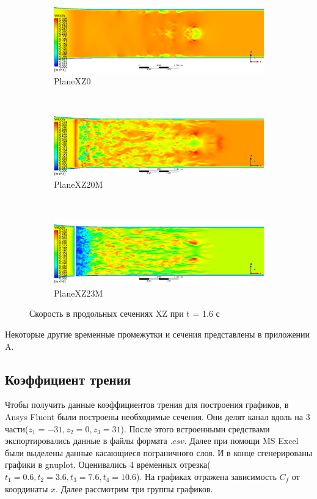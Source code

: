 	\begin{figure}[H]
		\begin{subfigure}{1\textwidth}
			\centering
			\includegraphics[width=1\linewidth]{../Assets/T16_Velocity_ContourXZ0}
			\caption{PlaneXZ0}
			\label{fig:T16VelocityContourXZ0}
		\end{subfigure}%
		\\
		\begin{subfigure}{1\textwidth}
			\centering
			\includegraphics[width=1\linewidth]{../Assets/T16_Velocity_ContourXZ20M}
			\caption{PlaneXZ20M}
			\label{fig:T16VelocityContourXZ20M}
		\end{subfigure}%
		\\
		\begin{subfigure}{1\textwidth}
			\centering
			\includegraphics[width=1\linewidth]{../Assets/T16_Velocity_ContourXZ23M}
			\caption{PlaneXZ23M}
			\label{fig:T16VelocityContourXZ23M}
		\end{subfigure}
	 	\caption{Скорость в продольных сечениях XZ при t = 1.6 с}
	 	\label{fig:T16VelocityContourXZ}
	\end{figure}
	Некоторые другие временные промежутки и сечения представлены в приложении A.
	\newpage
\subsection{Коэффициент трения}
	Чтобы получить данные коэффициентов трения для построения графиков, в Ansys Fluent были построены необходимые сечения. Они делят канал вдоль на 3 части($z_1 = -31, z_2 = 0, z_3 = 31$). После этого встроенными средствами экспортировались данные в файлы формата $.csv$. Далее при помощи MS Excel были выделены данные касающиеся пограничного слоя. И в конце сгенерированы графики в gnuplot. Оценивались 4 временных отрезка($t_1 = 0.6, t_2 = 3.6, t_3 = 7.6, t_4 = 10.6$). На графиках отражена зависимость $C_f$ от координаты $x$. Далее рассмотрим три группы графиков.
	
